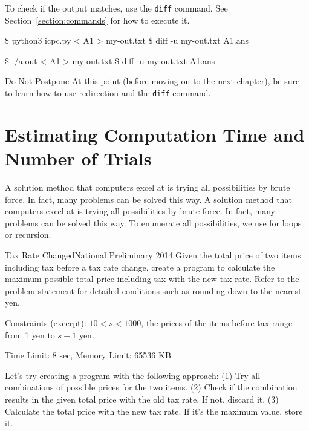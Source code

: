 To check if the output matches, use the \texttt{diff} command. See Section~\ref{section:commands} for how to execute it.

\begin{terminal}
\$ python3 icpc.py < A1 > my-out.txt
\$ diff -u my-out.txt A1.ans  
\end{terminal}

\begin{terminal}
\$ ./a.out < A1 > my-out.txt
\$ diff -u my-out.txt A1.ans  
\end{terminal}

\begin{warningbox}{Do Not Postpone}
  At this point (before moving on to the next chapter), be sure to learn how to use redirection and the \texttt{diff} command.
\end{warningbox}
\section{Estimating Computation Time and Number of Trials}

A solution method that computers excel at is trying all possibilities by brute force. In fact, many problems can be solved this way.
A solution method that computers excel at is trying all possibilities by brute force. In fact, many problems can be solved this way.
To enumerate all possibilities, we use for loops or recursion.

\begin{pbox}{Tax Rate Changed}{National Preliminary 2014}
Given the total price of two items including tax before a tax rate change, create a program to calculate the maximum possible total price including tax with the new tax rate. Refer to the problem statement for detailed conditions such as rounding down to the nearest yen.

Constraints (excerpt): $10 < s < 1000$, the prices of the items before tax range from 1 yen to $s-1$ yen.

Time Limit: 8 sec, Memory Limit: 65536 KB

\end{pbox}

Let's try creating a program with the following approach: (1) Try all combinations of possible prices for the two items. (2) Check if the combination results in the given total price with the old tax rate. If not, discard it. (3) Calculate the total price with the new tax rate. If it's the maximum value, store it.

